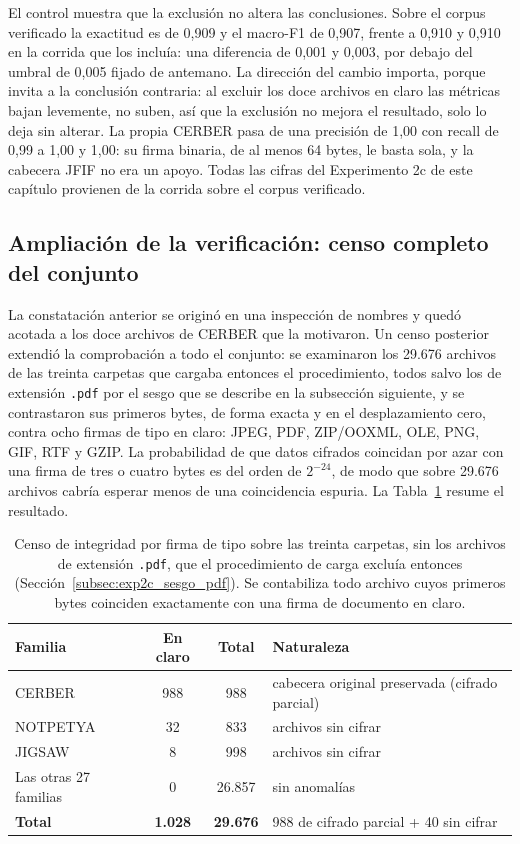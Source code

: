 El control muestra que la exclusión no altera las conclusiones. Sobre el corpus verificado la exactitud es de 0,909 y el macro-F1 de 0,907, frente a 0,910 y 0,910 en la corrida que los incluía: una diferencia de 0,001 y 0,003, por debajo del umbral de 0,005 fijado de antemano. La dirección del cambio importa, porque invita a la conclusión contraria: al excluir los doce archivos en claro las métricas bajan levemente, no suben, así que la exclusión no mejora el resultado, solo lo deja sin alterar. La propia CERBER pasa de una precisión de 1,00 con recall de 0,99 a 1,00 y 1,00: su firma binaria, de al menos 64 bytes, le basta sola, y la cabecera JFIF no era un apoyo. Todas las cifras del Experimento 2c de este capítulo provienen de la corrida sobre el corpus verificado.

\subsection{Ampliación de la verificación: censo completo del conjunto}
\label{subsec:exp2c_integridad_censo}

La constatación anterior se originó en una inspección de nombres y quedó acotada a los doce archivos de CERBER que la motivaron. Un censo posterior extendió la comprobación a todo el conjunto: se examinaron los 29.676 archivos de las treinta carpetas que cargaba entonces el procedimiento, todos salvo los de extensión \texttt{.pdf} por el sesgo que se describe en la subsección siguiente, y se contrastaron sus primeros bytes, de forma exacta y en el desplazamiento cero, contra ocho firmas de tipo en claro: JPEG, PDF, ZIP/OOXML, OLE, PNG, GIF, RTF y GZIP. La probabilidad de que datos cifrados coincidan por azar con una firma de tres o cuatro bytes es del orden de $2^{-24}$, de modo que sobre 29.676 archivos cabría esperar menos de una coincidencia espuria. La Tabla~\ref{tab:censo_integridad} resume el resultado.

\begin{table}[ht]
\centering
\caption{Censo de integridad por firma de tipo sobre las treinta carpetas, sin los archivos de extensión \texttt{.pdf}, que el procedimiento de carga excluía entonces (Sección~\ref{subsec:exp2c_sesgo_pdf}). Se contabiliza todo archivo cuyos primeros bytes coinciden exactamente con una firma de documento en claro.}
\label{tab:censo_integridad}
\begin{tabular}{|l|c|c|l|}
\hline
\textbf{Familia} & \textbf{En claro} & \textbf{Total} & \textbf{Naturaleza} \\
\hline
CERBER & 988 & 988 & cabecera original preservada (cifrado parcial) \\
NOTPETYA & 32 & 833 & archivos sin cifrar \\
JIGSAW & 8 & 998 & archivos sin cifrar \\
Las otras 27 familias & 0 & 26.857 & sin anomalías \\
\hline
\textbf{Total} & \textbf{1.028} & \textbf{29.676} & 988 de cifrado parcial + 40 sin cifrar \\
\hline
\end{tabular}
\end{table}

